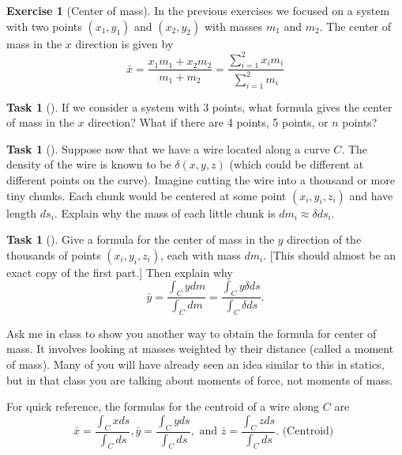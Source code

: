 \documentclass[10pt,]{book}
\theoremstyle{plain}
\theoremstyle{definition}
\theoremstyle{definition}
\theoremstyle{definition}
\theoremstyle{definition}
\newtheorem{exploration}[project]{Exercise}
\newtheorem{task}[project]{Task}
\theoremstyle{definition}
\numberwithin{equation}{section}
\begin{document}
\begin{exploration}[Center of mass]\label{center_of_mass_of_curve}
In the previous exercises we focused on a system with two points \((x_1,y_1)\) and \((x_2,y_2)\) with masses \(m_1\) and \(m_2\). The center of mass in the \(x\) direction is given by%
\begin{equation*}
\bar x = \frac{x_1m_1+x_2m_2}{m_1+m_2} = \frac{\sum_{i=1}^2x_i m_i}{\sum_{i=1}^2m_i}
\end{equation*}
%
\begin{task}[]\label{task-574}
If we consider a system with 3 points, what formula gives the center of mass in the \(x\) direction? What if there are 4 points, 5 points, or \(n\) points?%
\end{task}
\begin{task}[]\label{task-575}
Suppose now that we have a wire located along a curve \(C\). The density of the wire is known to be \(\delta(x,y,z)\) (which could be different at different points on the curve).  Imagine cutting the wire into a thousand or more tiny chunks.  Each chunk would be centered at some point \((x_i,y_i,z_i)\) and have length \(ds_i\). Explain why the mass of each little chunk is \(dm_i\approx\delta ds_i\).%
\end{task}
\begin{task}[]\label{task-576}
Give a formula for the center of mass in the \(y\) direction of the thousands of points \((x_i,y_i,z_i)\), each with mass \(dm_i\). [This should almost be an exact copy of the first part.] Then explain why%
\begin{equation*}
\bar y = \frac{\int_C y dm}{\int_C dm}=\frac{\int_C y \delta ds}{\int_C \delta ds}.
\end{equation*}
%
\end{task}
\end{exploration}
Ask me in class to show you another way to obtain the formula for center of mass. It involves looking at masses weighted by their distance (called a moment of mass). Many of you will have already seen an idea similar to this in statics, but in that class you are talking about moments of force, not moments of mass.%
\par
For quick reference, the formulas for the centroid of a wire along \(C\) are%
\begin{equation*}
\bar x = \frac{\int_C x ds}{\int_C  ds},
\bar y = \frac{\int_C y ds}{\int_C  ds}, 
\text{ and } 
\bar z = \frac{\int_C z ds}{\int_C  ds}.  \text{ (Centroid) }
\end{equation*}
%
\end{document}
